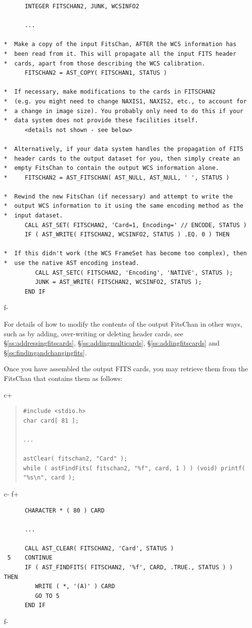 \documentclass[twoside,11pt]{article}
\newcommand{\secref}[1]{\S\ref{#1}}
\newcommand{\secref}[1]{\ref{#1}}
\begin{document}
\begin{verbatim}
      INTEGER FITSCHAN2, JUNK, WCSINFO2

      ...

*  Make a copy of the input FitsChan, AFTER the WCS information has
*  been read from it. This will propagate all the input FITS header
*  cards, apart from those describing the WCS calibration.
      FITSCHAN2 = AST_COPY( FITSCHAN1, STATUS )

*  If necessary, make modifications to the cards in FITSCHAN2
*  (e.g. you might need to change NAXIS1, NAXIS2, etc., to account for
*  a change in image size). You probably only need to do this if your
*  data system does not provide these facilities itself.
      <details not shown - see below>

*  Alternatively, if your data system handles the propagation of FITS
*  header cards to the output dataset for you, then simply create an
*  empty FitsChan to contain the output WCS information alone.
*     FITSCHAN2 = AST_FITSCHAN( AST_NULL, AST_NULL, ' ', STATUS )

*  Rewind the new FitsChan (if necessary) and attempt to write the
*  output WCS information to it using the same encoding method as the
*  input dataset.
      CALL AST_SET( FITSCHAN2, 'Card=1, Encoding=' // ENCODE, STATUS )
      IF ( AST_WRITE( FITSCHAN2, WCSINFO2, STATUS ) .EQ. 0 ) THEN

*  If this didn't work (the WCS FrameSet has become too complex), then
*  use the native AST encoding instead.
         CALL AST_SETC( FITSCHAN2, 'Encoding', 'NATIVE', STATUS );
         JUNK = AST_WRITE( FITSCHAN2, WCSINFO2, STATUS );
      END IF
\end{verbatim}
\normalsize
f-

For details of how to modify the contents of the output FitsChan in
other ways, such as by adding, over-writing or deleting header cards,
see \secref{ss:addressingfitscards}, \secref{ss:addingmulticards}, \secref{ss:addingfitscards} and
\secref{ss:findingandchangingfits}.

Once you have assembled the output FITS cards, you may retrieve them
from the FitsChan that contains them as follows:

c+
\begin{quote}
\small
\begin{verbatim}
#include <stdio.h>
char card[ 81 ];

...

astClear( fitschan2, "Card" );
while ( astFindFits( fitschan2, "%f", card, 1 ) ) (void) printf( "%s\n", card );
\end{verbatim}
\normalsize
\end{quote}
c-
f+
\small
\begin{verbatim}
      CHARACTER * ( 80 ) CARD

      ...

      CALL AST_CLEAR( FITSCHAN2, 'Card', STATUS )
 5    CONTINUE
      IF ( AST_FINDFITS( FITSCHAN2, '%f', CARD, .TRUE., STATUS ) ) THEN
         WRITE ( *, '(A)' ) CARD
         GO TO 5
      END IF
\end{verbatim}
\normalsize
f-
\end{document}
